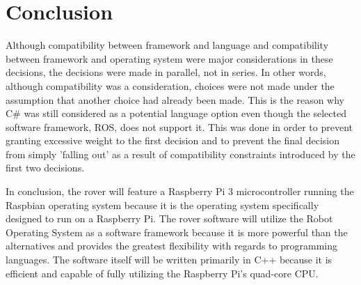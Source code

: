 \documentclass[onecolumn, draftclsnofoot,10pt, compsoc]{IEEEtran}
\begin{document}
\section{Conclusion}
Although compatibility between framework and language and compatibility between framework and operating system were major considerations in these decisions, the decisions were made in parallel, not in series. In other words, although compatibility was a consideration, choices were not made under the assumption that another choice had already been made. This is the reason why C\# was still considered as a potential language option even though the selected software framework, ROS, does not support it. This was done in order to prevent granting excessive weight to the first decision and to prevent the final decision from simply 'falling out' as a result of compatibility constraints introduced by the first two decisions.

In conclusion, the rover will feature a Raspberry Pi 3 microcontroller running the Raspbian operating system because it is the operating system specifically designed to run on a Raspberry Pi. The rover software will utilize the Robot Operating System as a software framework because it is more powerful than the alternatives and provides the greatest flexibility with regards to programming languages. The software itself will be written primarily in C++ because it is efficient and capable of fully utilizing the Raspberry Pi's quad-core CPU. 
\clearpage


\end{document}
